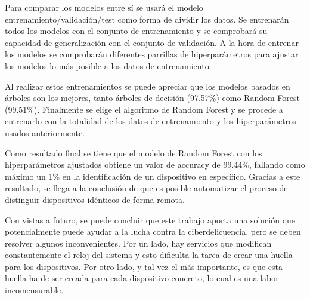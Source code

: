 Para comparar los modelos entre sí se usará el modelo entrenamiento/validación/test como forma de dividir los datos. Se entrenarán todos los modelos con el conjunto de entrenamiento y se comprobará su capacidad de generalización con el conjunto de validación. A la hora de entrenar los modelos se comprobarán diferentes parrillas de hiperparámetros para ajustar los modelos lo más posible a los datos de entrenamiento.

Al realizar estos entrenamientos se puede apreciar que los modelos basados en árboles son los mejores, tanto árboles de decisión (97.57\%) como Random Forest (99.51\%). Finalmente se elige el algoritmo de Random Forest y se procede a entrenarlo con la totalidad de los datos de entrenamiento y los hiperparámetros usados anteriormente. 

Como resultado final se tiene que el modelo de Random Forest con los hiperparámetros ajustados obtiene un valor de accuracy de 99.44\%, fallando como máximo un 1\% en la identificación de un dispositivo en específico. Gracias a este resultado, se llega a la conclusión de que es posible automatizar el proceso de distinguir dispositivos idénticos de forma remota.

Con vistas a futuro, se puede concluir que este trabajo aporta una solución que potencialmente puede ayudar a la lucha contra la ciberdelicuencia, pero se deben resolver algunos inconvenientes. Por un lado, hay servicios que modifican constantemente el reloj del sistema y esto dificulta la tarea de crear una huella para los dispositivos. Por otro lado, y tal vez el más importante, es que esta huella ha de ser creada para cada dispositivo concreto, lo cual es una labor incomensurable.

